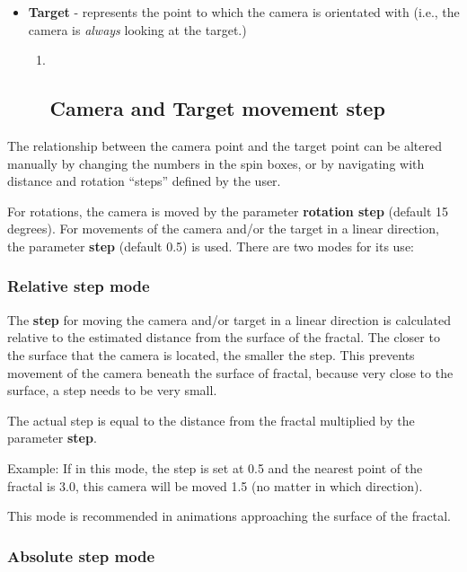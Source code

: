 \begin{itemize}
\item
  \textbf{Target} - represents the point to which the camera is
  orientated with (i.e., the camera is \emph{always} looking at the
  target.)

  \begin{enumerate}
  \def\labelenumi{\arabic{enumi}.}
  \item ~
    \hypertarget{camera-and-target-movement-step}{\subsection{Camera and
    Target movement step}\label{camera-and-target-movement-step}}
  \end{enumerate}
\end{itemize}

The relationship between the camera point and the target point can be
altered manually by changing the numbers in the spin boxes, or by
navigating with distance and rotation ``steps'' defined by the user.

For rotations, the camera is moved by the parameter \textbf{rotation
step} (default 15 degrees). For movements of the camera and/or the
target in a linear direction, the parameter \textbf{step} (default 0.5)
is used. There are two modes for its use:

\subsubsection{Relative step mode}\label{relative-step-mode}

The \textbf{step} for moving the camera and/or target in a linear
direction is calculated relative to the estimated distance from the
surface of the fractal. The closer to the surface that the camera is
located, the smaller the step. This prevents movement of the camera
beneath the surface of fractal, because very close to the surface, a
step needs to be very small.

The actual step is equal to the distance from the fractal multiplied by
the parameter \textbf{step}.

Example: If in this mode, the step is set at 0.5 and the nearest point
of the fractal is 3.0, this camera will be moved 1.5 (no matter in which
direction).

This mode is recommended in animations approaching the surface of the
fractal.

\subsubsection{Absolute step mode}\label{absolute-step-mode}

